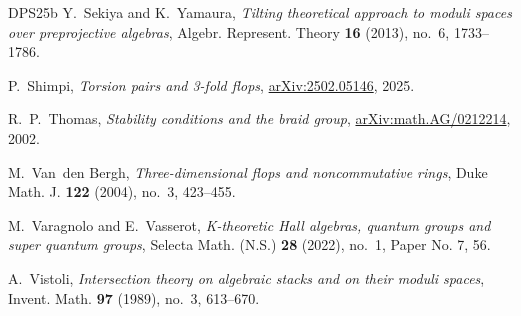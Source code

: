 \documentclass[reqno,a4paper]{amsart}
\theoremstyle{basic-theorem}
\numberwithin{equation}{section}
\begin{document}
\begin{thebibliography}{DPS{\etalchar{+}}25b}
	Y.~Sekiya and K.~Yamaura, \textit{Tilting theoretical approach to moduli spaces
		over preprojective algebras}, Algebr. Represent. Theory \textbf{16} (2013),
	no.~6, 1733--1786.
	
	P.~Shimpi, \textit{Torsion pairs and 3-fold flops},
	\href{https://arxiv.org/abs/2502.05146.pdf}{\sf arXiv:2502.05146}, 2025.
	
	R.~P.~Thomas, \textit{Stability conditions and the braid group}, \href{https://arxiv.org/abs/math/0212214}{\sf arXiv:math.AG/0212214}, 2002.
%	
	
	M.~Van~den Bergh, \textit{Three-dimensional flops and noncommutative rings}, Duke
	Math. J. \textbf{122} (2004), no.~3, 423--455.
	
	M.~Varagnolo and E.~Vasserot, \textit{K-theoretic {H}all algebras, quantum groups
		and super quantum groups}, Selecta Math. (N.S.) \textbf{28} (2022), no.~1,
	Paper No. 7, 56.
	
	A.~Vistoli, \textit{Intersection theory on algebraic stacks and on their moduli
		spaces}, Invent. Math. \textbf{97} (1989), no.~3, 613--670.
	
	
\end{thebibliography}
\end{document}
